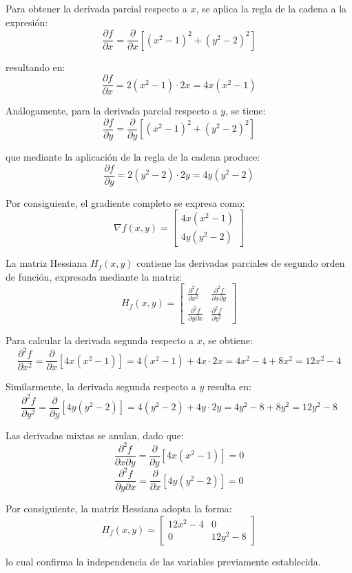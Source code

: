 \documentclass[12pt,a4paper]{article}
\begin{document}
Para obtener la derivada parcial respecto a $x$, se aplica la regla de la cadena a la expresión:
\[\frac{\partial f}{\partial x} = \frac{\partial}{\partial x}[(x^2 - 1)^2 + (y^2 - 2)^2]\]

resultando en:
\[\frac{\partial f}{\partial x} = 2(x^2 - 1) \cdot 2x = 4x(x^2 - 1)\]

Análogamente, para la derivada parcial respecto a $y$, se tiene:
\[\frac{\partial f}{\partial y} = \frac{\partial}{\partial y}[(x^2 - 1)^2 + (y^2 - 2)^2]\]

que mediante la aplicación de la regla de la cadena produce:
\[\frac{\partial f}{\partial y} = 2(y^2 - 2) \cdot 2y = 4y(y^2 - 2)\]

Por consiguiente, el gradiente completo se expresa como:
\[\nabla f(x,y) = \begin{bmatrix} 4x(x^2 - 1) \\ 4y(y^2 - 2) \end{bmatrix}\]

La matriz Hessiana $H_f(x,y)$ contiene las derivadas parciales de segundo orden de función, expresada mediante la matriz:
\[H_f(x,y) = \begin{bmatrix}
\frac{\partial^2 f}{\partial x^2} & \frac{\partial^2 f}{\partial x \partial y} \\
\frac{\partial^2 f}{\partial y \partial x} & \frac{\partial^2 f}{\partial y^2}
\end{bmatrix}\]

Para calcular la derivada segunda respecto a $x$, se obtiene:
\[\frac{\partial^2 f}{\partial x^2} = \frac{\partial}{\partial x}[4x(x^2 - 1)] = 4(x^2 - 1) + 4x \cdot 2x = 4x^2 - 4 + 8x^2 = 12x^2 - 4\]

Similarmente, la derivada segunda respecto a $y$ resulta en:
\[\frac{\partial^2 f}{\partial y^2} = \frac{\partial}{\partial y}[4y(y^2 - 2)] = 4(y^2 - 2) + 4y \cdot 2y = 4y^2 - 8 + 8y^2 = 12y^2 - 8\]

Las derivadas mixtas se anulan, dado que:
\[\frac{\partial^2 f}{\partial x \partial y} = \frac{\partial}{\partial y}[4x(x^2 - 1)] = 0\]
\[\frac{\partial^2 f}{\partial y \partial x} = \frac{\partial}{\partial x}[4y(y^2 - 2)] = 0\]

Por consiguiente, la matriz Hessiana adopta la forma:
\[H_f(x,y) = \begin{bmatrix}
12x^2 - 4 & 0 \\
0 & 12y^2 - 8
\end{bmatrix}\]

lo cual confirma la independencia de las variables previamente establecida.
\end{document}
